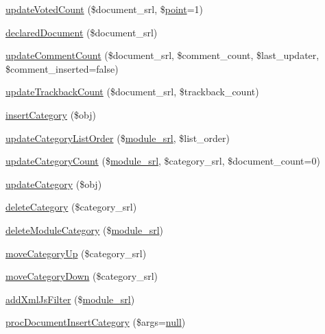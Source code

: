 \begin{DoxyCompactItemize}
\item 
\hyperlink{classdocumentController_aca82ae9abe825d3ee6182d3608e71e31}{update\+Voted\+Count} (\$document\+\_\+srl, \$\hyperlink{classpoint}{point}=1)
\item 
\hyperlink{classdocumentController_aa2cdd129c5f882d535e39728761d4168}{declared\+Document} (\$document\+\_\+srl)
\item 
\hyperlink{classdocumentController_a1813c01d82596b3ddb48c1bde746428e}{update\+Comment\+Count} (\$document\+\_\+srl, \$comment\+\_\+count, \$last\+\_\+updater, \$comment\+\_\+inserted=false)
\item 
\hyperlink{classdocumentController_ab932f88ad36638495bb5db441737edef}{update\+Trackback\+Count} (\$document\+\_\+srl, \$trackback\+\_\+count)
\item 
\hyperlink{classdocumentController_a5809b6e744e354b7979788f8a4d2d825}{insert\+Category} (\$obj)
\item 
\hyperlink{classdocumentController_a6f3fe3265fd98035ffdd849a03dbe45c}{update\+Category\+List\+Order} (\$\hyperlink{ko_8install_8php_a370bb6450fab1da3e0ed9f484a38b761}{module\+\_\+srl}, \$list\+\_\+order)
\item 
\hyperlink{classdocumentController_a6c2c3cad331e43a7fff774142fe62d00}{update\+Category\+Count} (\$\hyperlink{ko_8install_8php_a370bb6450fab1da3e0ed9f484a38b761}{module\+\_\+srl}, \$category\+\_\+srl, \$document\+\_\+count=0)
\item 
\hyperlink{classdocumentController_a7a4e53cda0765a416280e403b6193b0a}{update\+Category} (\$obj)
\item 
\hyperlink{classdocumentController_ad5840bc0f6ed0040779c5d90d8c327a6}{delete\+Category} (\$category\+\_\+srl)
\item 
\hyperlink{classdocumentController_a8a357bcedee02e8fda122ed24f2a9c1c}{delete\+Module\+Category} (\$\hyperlink{ko_8install_8php_a370bb6450fab1da3e0ed9f484a38b761}{module\+\_\+srl})
\item 
\hyperlink{classdocumentController_a16a00fabad8b270e40d7fa196350280c}{move\+Category\+Up} (\$category\+\_\+srl)
\item 
\hyperlink{classdocumentController_ab6befd47268a1fbfcc56dda3c3a71dc4}{move\+Category\+Down} (\$category\+\_\+srl)
\item 
\hyperlink{classdocumentController_a1fe6155cfd253e19d0583cc74a2cab35}{add\+Xml\+Js\+Filter} (\$\hyperlink{ko_8install_8php_a370bb6450fab1da3e0ed9f484a38b761}{module\+\_\+srl})
\item 
\hyperlink{classdocumentController_aad9894e1432083a62a883568c7b3a42b}{proc\+Document\+Insert\+Category} (\$args=\hyperlink{modernizr_8min_8js_a286f9ec831c5e676eeb493248eab9575}{null})

\end{DoxyCompactItemize}
